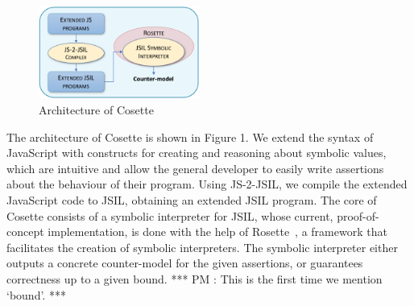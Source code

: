 \documentclass[acmsmall,review,anonymous]{acmart}\settopmatter{printfolios=true,printccs=false,printacmref=false}
\def\jsinline{\lstinline[language=JavaScript, basicstyle=\small]}
\newcommand{\jsil}{JSIL\xspace}
\newcommand{\JSComp}{JS-2-JSIL\xspace}
\newcommand{\cosette}{Cosette\xspace}
\newcommand{\myparagraph}[1]{\smallskip\noindent {\bf #1.}\hspace{1pt}}
\newcommand{\pmaxinline}[1]{ {\color{blue} *** PM : #1 ***} }
\begin{document}
\begin{figure}
\vspace*{-0.45cm}
\centering
\includegraphics[width=0.47\textwidth]{figures/jilette_blue.png}
\vspace*{-0.23cm}
\caption{Architecture of \cosette}
\vspace*{-0.4cm}
\label{fig:jilette:diagram}
\end{figure}

\myparagraph{Architecture} The architecture of \cosette is shown in Figure 1. We extend the syntax of JavaScript with constructs for creating and reasoning about symbolic values, which are intuitive and allow the general developer to easily write assertions about the behaviour of their program. Using \JSComp, we compile the extended JavaScript code to \jsil, obtaining an extended \jsil program. The core of \cosette consists of a symbolic interpreter for
\jsil, whose current, proof-of-concept implementation, is done with the help of Rosette~\cite{Rosette2,Rosette1}, a framework that facilitates the creation of symbolic interpreters. The symbolic interpreter either outputs a concrete counter-model for the given assertions, or guarantees correctness up to a given bound. \pmaxinline{This is the first time we mention `bound'.}

\end{document}
